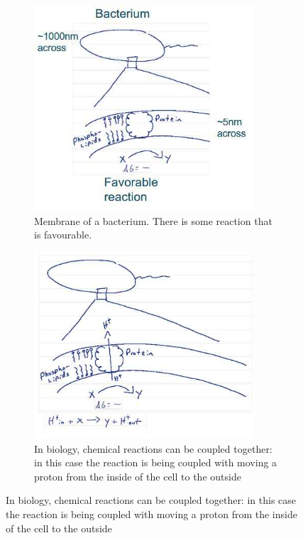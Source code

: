 \documentclass[]{article}
\begin{document}
\begin{figure}[H]
	\caption{How do cells use their membranes to couple chemical reactions?}\label{fig:ChemioOsmosis}
	\begin{subfigure}[t]{0.45\textwidth}
		\caption{Membrane of a bacterium. There is some reaction that is favourable.}\label{fig:ChemioOsmosis0}
		\includegraphics[width=0.9\textwidth]{ChemioOsmosis0}
	\end{subfigure}
	\;\;
	\begin{subfigure}[t]{0.45\textwidth}
		\caption{In biology, chemical reactions can be coupled together: in this case the reaction is being coupled with moving a proton from the inside of the cell to the outside}\label{fig:ChemioOsmosis1}
		\includegraphics[width=0.9\textwidth]{ChemioOsmosis1}

\end{subfigure}
\end{figure}
\end{document}
